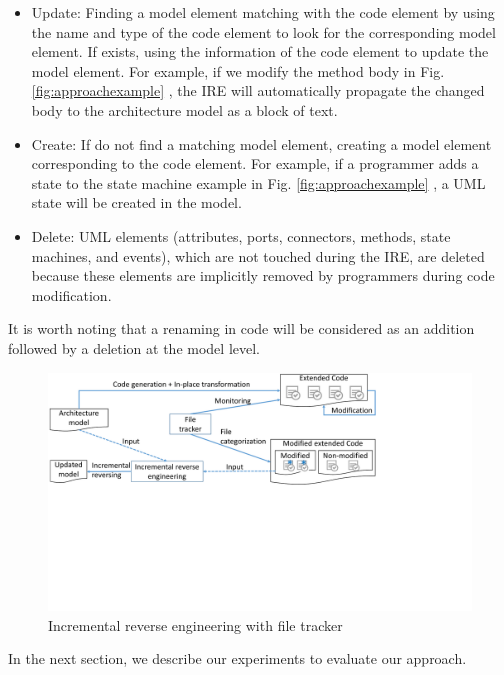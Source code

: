 \begin{itemize}
	\item Update: Finding a model element matching with the code element by using the name and type of the code element to look for the corresponding model element. 
	If exists, using the information of the code element to update the model element.
	For example, if we modify the  method body in Fig. \ref{fig:approachexample} , the IRE will automatically propagate the changed body to the architecture model as a block of text.
	
	\item Create: If do not find a matching model element, creating a model element corresponding to the code element. 
	For example, if a programmer adds a state to the state machine example in Fig. \ref{fig:approachexample} , a UML state will be created in the model.
	
	\item Delete: UML elements (attributes, ports, connectors, methods, state machines, and events), which are not touched during the IRE, are deleted because these elements are implicitly removed by programmers during code modification.
\end{itemize}

It is worth noting that a renaming in code will be considered as an addition followed by a deletion at the model level.


\begin{figure}
	\centering
	\includegraphics[clip, trim=0cm 10.1cm 7.0cm 0cm, width=0.9\columnwidth]{figures/incrementalreverse.pdf}
	\caption{Incremental reverse engineering with file tracker} 
	\label{fig:incrementalreverse}
\end{figure}

In the next section, we describe our experiments to evaluate our approach.


%

%
%

